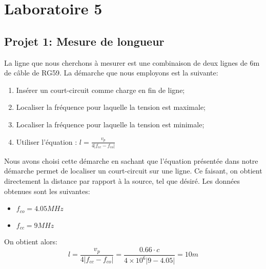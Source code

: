 



\label{s:experimentation}
\chapter{Laboratoire 5}
\section{Projet 1: Mesure de longueur}
La ligne que nous cherchons à mesurer est une combinaison de deux lignes de 6m de câble de RG59. La démarche que nous employons est la suivante:
\begin{enumerate}
\item Insérer un court-circuit comme charge en fin de ligne;
\item Localiser la fréquence pour laquelle la tension est maximale;
\item Localiser la fréquence pour laquelle la tension est minimale;
\item Utiliser l'équation : $ l = \frac{v_p}{4\left|f_{cc} - f_{co}\right|}$
\end{enumerate}
Nous avons choisi cette démarche en sachant que l'équation présentée dans notre démarche permet de localiser un court-circuit sur une ligne. Ce faisant, on obtient directement la distance par rapport à la source, tel que désiré. Les données obtenues sont les suivantes:
\begin{itemize}
\item $f_{co} = 4.05MHz $
\item $f_{cc} = 9MHz$
\end{itemize}
On obtient alors:
\begin{equation}
l = \frac{v_p}{4\left|f_{cc} - f_{co}\right|} = \frac{0.66\cdot c}{4\times 10^6\left|9 - 4.05\right|} = 10m
\end{equation}
